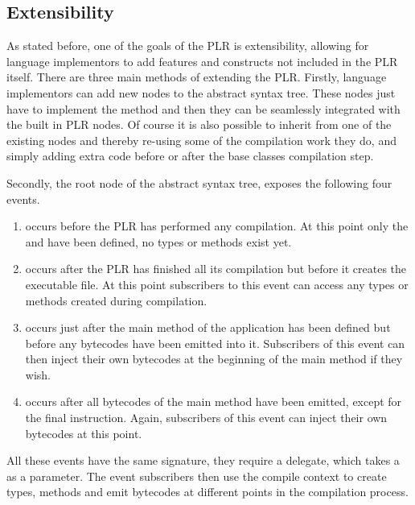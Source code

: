\subsection{Extensibility}
	
	As stated before, one of the goals of the PLR is extensibility, allowing
	for language implementors to add features and constructs not included in
	the PLR itself. There are three main methods of extending the PLR. Firstly,
	language implementors can add new nodes to the abstract syntax tree. These
	nodes just have to implement the  method and then they can
	be seamlessly integrated with the built in PLR nodes. Of course it is also
	possible to inherit from one of the existing nodes and thereby re-using some
	of the compilation work they do, and simply adding extra code before or after
	the base classes compilation step. 
	
	Secondly, the root node of the abstract	syntax tree,  
	exposes the following four events. 
	
	\begin{enumerate}
		\item {} occurs before the PLR has performed any 
		compilation. At this point only the  and 
		 have been defined, no types or methods exist yet.
		
		\item {} occurs after the PLR has finished all its
		compilation but before it creates the executable file. At this point
		subscribers to this event can access any types or methods created during
		compilation.
		
		\item {} occurs just after the main method of the
		application has been defined but before any bytecodes have been emitted
		into it. Subscribers of this event can then inject their own bytecodes at 
		the beginning of the main method if they wish.
		
		\item {} occurs after all bytecodes of the main method
		have been emitted, except for the final  instruction. Again, 
		subscribers of this event can inject their own bytecodes at this point.
	\end{enumerate}
	
	All these events have the same signature, they require a 
	 delegate, which takes a  
	as a parameter. The event subscribers then use the compile context to create 
	types, methods and emit bytecodes at different points in the compilation 
	process.
	
